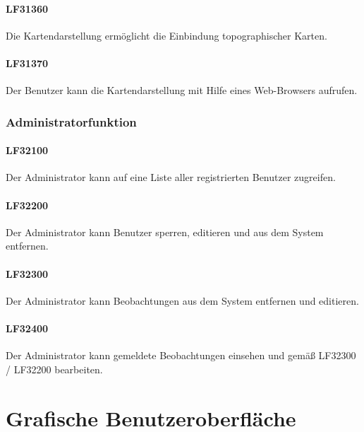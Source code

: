 \documentclass[a4paper,11pt]{scrartcl}
\begin{document}
			\paragraph{LF31360}
				Die Kartendarstellung ermöglicht die Einbindung topographischer Karten.
			\paragraph{LF31370}
				Der Benutzer kann die Kartendarstellung mit Hilfe eines Web-Browsers aufrufen.
		\subsubsection{Administratorfunktion}
			\paragraph{LF32100}
				Der Administrator kann auf eine Liste aller registrierten Benutzer zugreifen.
			\paragraph{LF32200}
				Der Administrator kann Benutzer sperren, editieren und aus dem System entfernen.
			\paragraph{LF32300}
				Der Administrator kann Beobachtungen aus dem System entfernen und editieren.
			\paragraph{LF32400}
				Der Administrator kann gemeldete Beobachtungen einsehen und gemäß LF32300 / LF32200 bearbeiten.

\section{Grafische Benutzeroberfläche}
\end{document}
